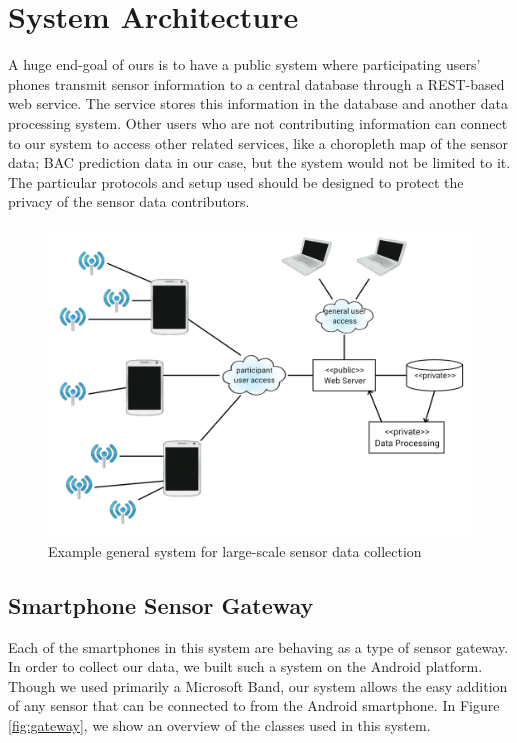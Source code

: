 \section{System Architecture}

A huge end-goal of ours is to have a public system where participating users' phones transmit sensor information to a central database through a REST-based web service. The service stores this information in the database and another data processing system. Other users who are not contributing information can connect to our system to access other related services, like a choropleth map of the sensor data; BAC prediction data in our case, but the system would not be limited to it. The particular protocols and setup used should be designed to protect the privacy of the sensor data contributors.

\begin{figure}
	\includegraphics[width=1.0\textwidth]{figs/system}
	\caption{Example general system for large-scale sensor data collection}
	\label{fig:system}
\end{figure}

\subsection{Smartphone Sensor Gateway}

Each of the smartphones in this system are behaving as a type of sensor gateway. In order to collect our data, we built such a system on the Android platform. Though we used primarily a Microsoft Band, our system allows the easy addition of any sensor that can be connected to from the Android smartphone. In Figure \ref{fig:gateway}, we show an overview of the classes used in this system.

